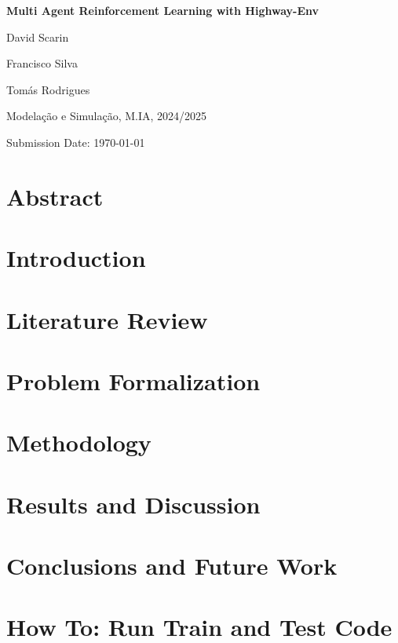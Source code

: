 \documentclass[a4paper,10pt]{report}
\begin{document}
\begin{titlepage}
    \centering
    {\Huge\bfseries Multi Agent Reinforcement Learning with Highway-Env\par}
    \vspace{1cm}
    {\Large David Scarin\par}
    {\Large Francisco Silva\par}
    {\Large Tomás Rodrigues\par}
    \vspace{1cm}
    {\Large Modelação e Simulação, M.IA, 2024/2025\par}
    \vfill
    Submission Date: \today
\end{titlepage}

\tableofcontents
\newpage

\chapter*{Abstract}  %

\chapter{Introduction}


\chapter{Literature Review}


\chapter{Problem Formalization}


\chapter{Methodology}


\chapter{Results and Discussion}


\chapter{Conclusions and Future Work}


\printbibliography

\appendix
\chapter{How To: Run Train and Test Code}

\end{document}
